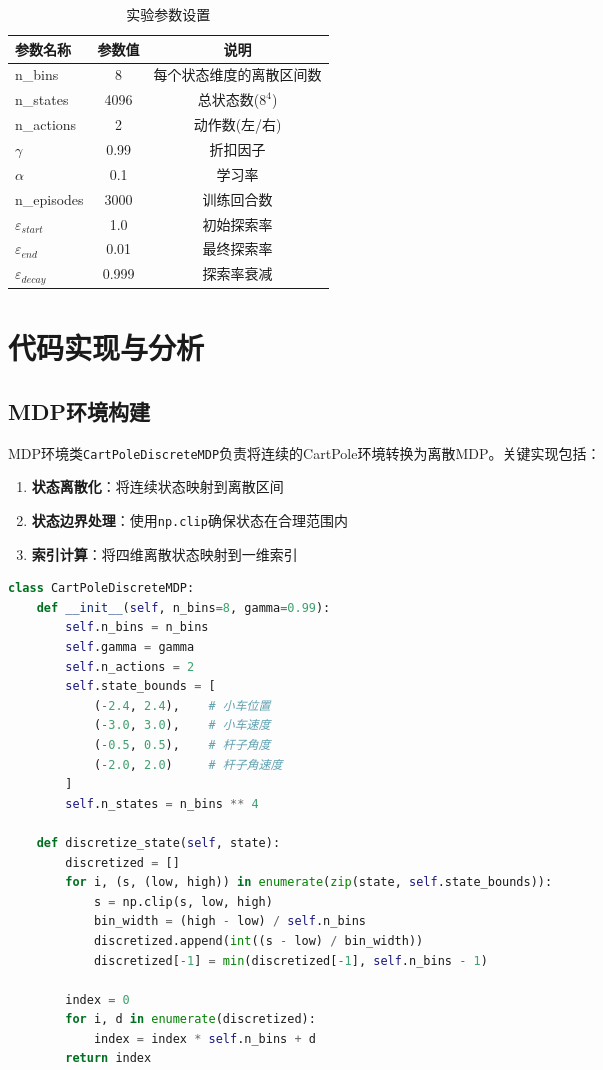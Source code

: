 \documentclass[12pt,a4paper]{article}
\begin{document}
\begin{table}[H]
\centering
\caption{实验参数设置}
\begin{tabular}{lcc}
\toprule
\textbf{参数名称} & \textbf{参数值} & \textbf{说明} \\
\midrule
n\_bins & 8 & 每个状态维度的离散区间数 \\
n\_states & 4096 & 总状态数($8^4$) \\
n\_actions & 2 & 动作数(左/右) \\
$\gamma$ & 0.99 & 折扣因子 \\
$\alpha$ & 0.1 & 学习率 \\
n\_episodes & 3000 & 训练回合数 \\
$\varepsilon_{start}$ & 1.0 & 初始探索率 \\
$\varepsilon_{end}$ & 0.01 & 最终探索率 \\
$\varepsilon_{decay}$ & 0.999 & 探索率衰减 \\
\bottomrule
\end{tabular}
\end{table}

\section{代码实现与分析}

\subsection{MDP环境构建}

MDP环境类\texttt{CartPoleDiscreteMDP}负责将连续的CartPole环境转换为离散MDP。关键实现包括：

\begin{enumerate}
    \item \textbf{状态离散化}：将连续状态映射到离散区间
    \item \textbf{状态边界处理}：使用\texttt{np.clip}确保状态在合理范围内
    \item \textbf{索引计算}：将四维离散状态映射到一维索引
\end{enumerate}

\begin{lstlisting}[language=Python]
class CartPoleDiscreteMDP:
    def __init__(self, n_bins=8, gamma=0.99):
        self.n_bins = n_bins
        self.gamma = gamma
        self.n_actions = 2
        self.state_bounds = [
            (-2.4, 2.4),    # 小车位置
            (-3.0, 3.0),    # 小车速度
            (-0.5, 0.5),    # 杆子角度
            (-2.0, 2.0)     # 杆子角速度
        ]
        self.n_states = n_bins ** 4
    
    def discretize_state(self, state):
        discretized = []
        for i, (s, (low, high)) in enumerate(zip(state, self.state_bounds)):
            s = np.clip(s, low, high)
            bin_width = (high - low) / self.n_bins
            discretized.append(int((s - low) / bin_width))
            discretized[-1] = min(discretized[-1], self.n_bins - 1)
        
        index = 0
        for i, d in enumerate(discretized):
            index = index * self.n_bins + d
        return index
\end{lstlisting}
\end{document}
